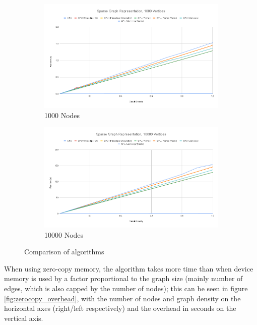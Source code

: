 \documentclass[letta4 paper]{article}
\numberwithin{equation}{section}
\newcommand{\0}{\mathbf{0}}
\begin{document}
\begin{figure}
    \centering
    \begin{subfigure}{0.45\textwidth}
        \includegraphics[width=\textwidth]{img/sparse/sparse1000.png}
        \caption{1000 Nodes}
        \label{fig:sparse1000}
    \end{subfigure}
    \hfill
    \begin{subfigure}{0.45\textwidth}
        \includegraphics[width=\textwidth]{img/sparse/sparse10000.png}
        \caption{10000 Nodes}
        \label{fig:sparse10000}
    \end{subfigure}
    \caption{Comparison of algorithms}
    \label{fig:sparse}
\end{figure}

When using zero-copy memory, the algorithm takes more time than when device
memory is used by a factor proportional to the graph size (mainly number of
edges, which is also capped by the number of nodes); this can be seen in
figure \ref{fig:zerocopy_overhead}, with the number of nodes and graph density
on the horizontal axes (right/left respectively) and the overhead in seconds
on the vertical axis.
\end{document}
